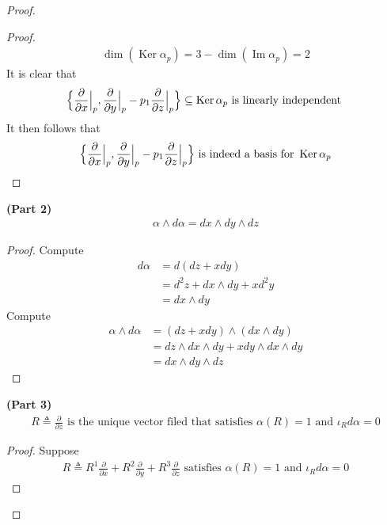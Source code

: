 \documentclass{report}
\begin{document}
\begin{proof}
\begin{proof}
\begin{align*}
\operatorname{dim}(\operatorname{Ker}\alpha_p)=3- \operatorname{dim}(\operatorname{Im}\alpha _p)= 2
\end{align*}
It is clear that 
\begin{align*}
  \Big\{ \frac{\partial }{\partial x}\Big|_{p}, \frac{\partial }{\partial y}\Big|_{p}-p_1 \frac{\partial }{\partial z}\Big|_{p} \Big\}\subseteq \operatorname{Ker}\alpha _p\text{ is linearly independent }
\end{align*}
It then follows that 
\begin{align*}
  \Big\{ \frac{\partial }{\partial x}\Big|_{p}, \frac{\partial }{\partial y}\Big|_{p}-p_1 \frac{\partial }{\partial z}\Big|_{p} \Big\} \text{ is indeed a basis for }\operatorname{Ker}\alpha _p
\end{align*}
\end{proof}
\begin{theorem}
\textbf{(Part 2)} 
\begin{align*}
\alpha \wedge  d \alpha  = dx \wedge  dy \wedge  dz   
\end{align*}
\end{theorem}
\begin{proof}
Compute 
\begin{align*}
d\alpha &= d(dz+xdy)\\
&=d^2z+dx\wedge  dy+ xd^2y \\
&=dx\wedge  dy   
\end{align*}
Compute 
\begin{align*}
\alpha \wedge  d\alpha &= (dz+xdy)\wedge (dx \wedge  dy )\\
&= dz\wedge  dx \wedge  dy + x dy \wedge  dx\wedge  dy \\
&=dx\wedge  dy \wedge  dz       
\end{align*}
\end{proof}
\begin{theorem}
\textbf{(Part 3)} 
\begin{align*}
R\triangleq  \frac{\partial }{\partial z}\text{ is the unique vector filed that satisfies }\alpha (R)=1 \text{ and }\iota_R d\alpha =0 
\end{align*}
\end{theorem}
\begin{proof}
Suppose 
\begin{align*}
R\triangleq R^1 \frac{\partial }{\partial x}+ R^2 \frac{\partial }{\partial y}+ R^3 \frac{\partial }{\partial z}\text{ satisfies }\alpha (R)=1 \text{ and }\iota_R d\alpha =0 
\end{align*}

\end{proof}
\end{proof}
\end{document}

